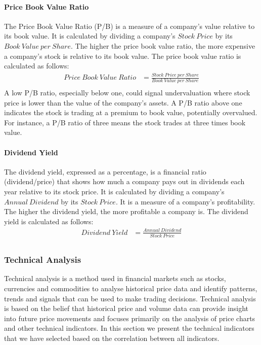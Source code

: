 \documentclass[../xlapes02]{subfiles}
\begin{document}
    \paragraph{Price Book Value Ratio}\label{par:price-book-value-ratio}
    The Price Book Value Ratio (P/B) is a measure of a company's value relative to its book value. It is calculated by dividing a company's $Stock\ Price$ by its $Book\ Value\ per\ Share$. The higher the price book value ratio, the more expensive a company's stock is relative to its book value. The price book value ratio is calculated as follows:
    \begin{equation}
        \begin{split}
            Price\ Book\ Value\ Ratio&=\frac{Stock\ Price\ per\ Share}{Book\ Value\ per\ Share}\\
        \end{split}\label{eq:equation5}
    \end{equation}
    A low P/B ratio, especially below one, could signal undervaluation where stock price is lower than the value of the company's assets. A P/B ratio above one indicates the stock is trading at a premium to book value, potentially overvalued. For instance, a P/B ratio of three means the stock trades at three times book value.

    \paragraph{Dividend Yield}\label{par:dividend-yield}
    The dividend yield, expressed as a percentage, is a financial ratio (dividend/price) that shows how much a company pays out in dividends each year relative to its stock price. It is calculated by dividing a company's $Annual\ Dividend$ by its $Stock\ Price$. It is a measure of a company's profitability. The higher the dividend yield, the more profitable a company is. The dividend yield is calculated as follows:
    \begin{equation}
        \begin{split}
            Dividend\ Yield&=\frac{Annual\ Dividend}{Stock\ Price}\\
        \end{split}\label{eq:equation5}
    \end{equation}

    \subsubsection{Technical Analysis}\label{subsubsec:technical-analysis}
    Technical analysis is a method used in financial markets such as stocks, currencies and commodities to analyse historical price data and identify patterns, trends and signals that can be used to make trading decisions. Technical analysis is based on the belief that historical price and volume data can provide insight into future price movements and focuses primarily on the analysis of price charts and other technical indicators. In this section we present the technical indicators that we have selected based on the correlation between all indicators.
\end{document}
